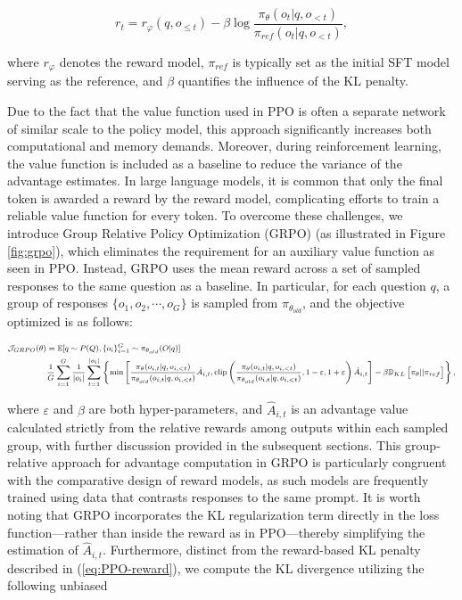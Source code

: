 \begin{equation}
    r_{t} = r_\varphi(q, o_{\le t}) - \beta \log\frac{\pi_{\theta}(o_{t}|q, o_{<t})}{\pi_{ref}(o_{t}|q, o_{<t})},
\label{eq:PPO-reward}
\end{equation}

where $r_\varphi$ denotes the reward model, $\pi_{ref}$ is typically set as the initial SFT model serving as the reference, and $\beta$ quantifies the influence of the KL penalty.

Due to the fact that the value function used in PPO is often a separate network of similar scale to the policy model, this approach significantly increases both computational and memory demands. Moreover, during reinforcement learning, the value function is included as a baseline to reduce the variance of the advantage estimates. In large language models, it is common that only the final token is awarded a reward by the reward model, complicating efforts to train a reliable value function for every token. To overcome these challenges, we introduce Group Relative Policy Optimization (GRPO) (as illustrated in Figure \ref{fig:grpo}), which eliminates the requirement for an auxiliary value function as seen in PPO. Instead, GRPO uses the mean reward across a set of sampled responses to the same question as a baseline. In particular, for each question $q$, a group of responses $\{o_1, o_2, \cdots, o_G\}$ is sampled from $\pi_{\theta_{old}}$, and the objective optimized is as follows:

\begin{equation}
\footnotesize
\begin{split}
    \mathcal{J}_{GRPO}(\theta) &= \mathbb{E}{[q \sim P(Q), \{o_i\}_{i=1}^G \sim \pi_{\theta_{old}}(O|q)]}  \\
    & \frac{1}{G}\sum_{i=1}^G\frac{1}{|o_i|} \sum_{t=1}^{|o_i|} \left\{ \min \left[ \frac{\pi_\theta(o_{i,t} | q, o_{i,<t})}{\pi_{\theta_{old}}(o_{i,t} | q, o_{i,<t})} \hat{A}_{i,t}, \text{clip} \left( \frac{\pi_\theta(o_{i,t} | q, o_{i,<t})}{\pi_{\theta_{old}}(o_{i,t} | q, o_{i,<t})}, 1 - \varepsilon, 1 + \varepsilon \right)  \hat{A}_{i,t} \right] - \beta \mathbb{D}_{KL}\left[\pi_{\theta} || \pi_{ref}\right]\right\} ,
\end{split}
\label{eq:GRPO-obj}
\end{equation}

where $\varepsilon$ and $\beta$ are both hyper-parameters, and $\hat{A}_{i,t}$ is an advantage value calculated strictly from the relative rewards among outputs within each sampled group, with further discussion provided in the subsequent sections. This group-relative approach for advantage computation in GRPO is particularly congruent with the comparative design of reward models, as such models are frequently trained using data that contrasts responses to the same prompt. It is worth noting that GRPO incorporates the KL regularization term directly in the loss function—rather than inside the reward as in PPO—thereby simplifying the estimation of $\hat{A}_{i,t}$. Furthermore, distinct from the reward-based KL penalty described in (\ref{eq:PPO-reward}), we compute the KL divergence utilizing the following unbiased

